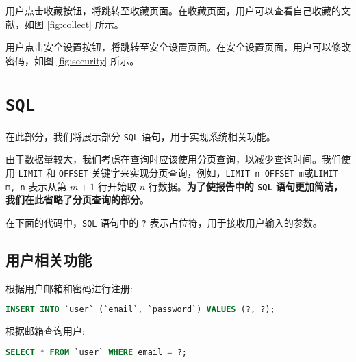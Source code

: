 \documentclass[UTF8,openany]{ctexbook}
\begin{document}

用户点击收藏按钮，将跳转至收藏页面。在收藏页面，用户可以查看自己收藏的文献，如图 \ref{fig:collect} 所示。


用户点击安全设置按钮，将跳转至安全设置页面。在安全设置页面，用户可以修改密码，如图 \ref{fig:security} 所示。


\chapter{\texttt{SQL}}
\label{sec:sql}

在此部分，我们将展示部分 \texttt{SQL} 语句，用于实现系统相关功能。

由于数据量较大，我们考虑在查询时应该使用分页查询，以减少查询时间。我们使用 \texttt{LIMIT} 和 \texttt{OFFSET} 关键字来实现分页查询，例如，\texttt{LIMIT n OFFSET m}或\texttt{LIMIT m, n} 表示从第 $m+1$ 行开始取 $n$ 行数据。\textbf{为了使报告中的 \texttt{SQL} 语句更加简洁，我们在此省略了分页查询的部分}。

在下面的代码中，\texttt{SQL} 语句中的 \texttt{?} 表示占位符，用于接收用户输入的参数。

\section{用户相关功能}

根据用户邮箱和密码进行注册:

\begin{lstlisting}[language=SQL]
INSERT INTO `user` (`email`, `password`) VALUES (?, ?);
\end{lstlisting}

根据邮箱查询用户:

\begin{lstlisting}[language=SQL]
SELECT * FROM `user` WHERE email = ?;
\end{lstlisting}
\end{document}
